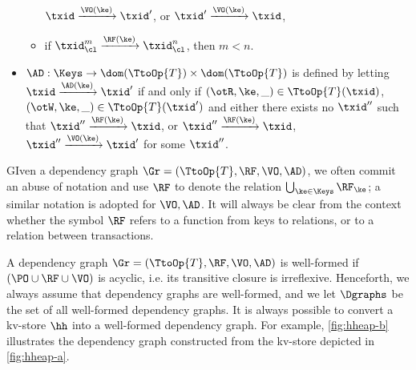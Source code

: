 \begin{definition}
\begin{itemize}
\begin{itemize}
$\txid \xrightarrow{\VO(\ke)} \txid'$, or $\txid' \xrightarrow{\VO(\ke)} \txid$, 
\item if $\txid_{\cl}^{m} \xrightarrow{\RF(\ke)} \txid_{\cl}^{n}$, then $m < n$.
\end{itemize}
\item $\AD: \Keys \rightarrow \dom(\TtoOp{T}) \times \dom(\TtoOp{T})$ is defined 
by letting $\txid \xrightarrow{\AD(\ke)} \txid'$ if and only if $(\otR, \ke, \_) \in \TtoOp{T}(\txid)$, 
$(\otW, \ke, \_) \in \TtoOp{T}(\txid')$ and 
either there exists no $\txid''$ such that $\txid'' \xrightarrow{\RF(\ke)} \txid$, or 
$\txid'' \xrightarrow{\RF(\ke)} \txid$, $\txid'' \xrightarrow{\VO(\ke)} \txid'$ for 
some $\txid''$.
\end{itemize}
\end{definition}
GIven a dependency graph $\Gr = (\TtoOp{T}, \RF, \VO, \AD)$, we often 
commit an abuse of notation and use $\RF$ to denote the relation 
$\bigcup_{\ke \in \Keys} \RF_{\ke}$; a similar notation is adopted for $\VO, \AD$. 
It will always be clear from the context whether the symbol $\RF$ refers to a function 
from keys to relations, or to a relation between transactions. 

A dependency graph $\Gr = (\TtoOp{T}, \RF, \VO, \AD)$ is well-formed if 
$(\PO \cup \RF \cup \VO)$ is acyclic, i.e. its transitive closure is irreflexive. 
Henceforth, we always assume that dependency graphs are well-formed, 
and we let $\Dgraphs$ be the set of all well-formed dependency graphs.
It is always possible to convert a kv-store $\hh$ into a well-formed dependency 
graph. For example, \cref{fig:hheap-b} illustrates the dependency graph constructed 
from the kv-store depicted in \cref{fig:hheap-a}.

